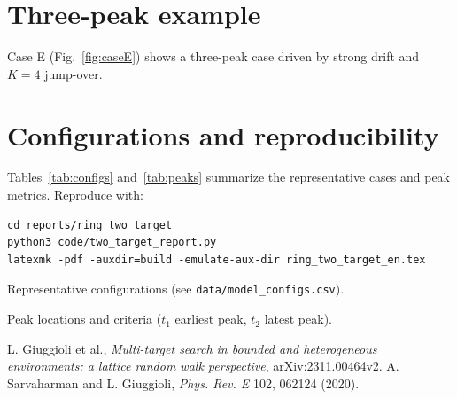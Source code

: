 \documentclass[11pt]{article}
\begin{document}
\section*{Three-peak example}
Case E (Fig.~\ref{fig:caseE}) shows a three-peak case driven by strong drift and $K=4$ jump-over.

\section*{Configurations and reproducibility}
Tables~\ref{tab:configs} and~\ref{tab:peaks} summarize the representative cases and peak metrics.
Reproduce with:
\begin{verbatim}
cd reports/ring_two_target
python3 code/two_target_report.py
latexmk -pdf -auxdir=build -emulate-aux-dir ring_two_target_en.tex
\end{verbatim}

\begin{table}[!htbp]
  \centering
  \caption{Representative configurations (see \texttt{data/model\_configs.csv}).}
  \label{tab:configs}
  
\end{table}

\begin{table}[!htbp]
  \centering
  \caption{Peak locations and criteria ($t_1$ earliest peak, $t_2$ latest peak).}
  \label{tab:peaks}
  
\end{table}

\begin{thebibliography}{9}
L. Giuggioli et al., \emph{Multi-target search in bounded and heterogeneous environments: a lattice random walk perspective}, arXiv:2311.00464v2.
A. Sarvaharman and L. Giuggioli, \emph{Phys. Rev. E} 102, 062124 (2020).
\end{thebibliography}
\end{document}

